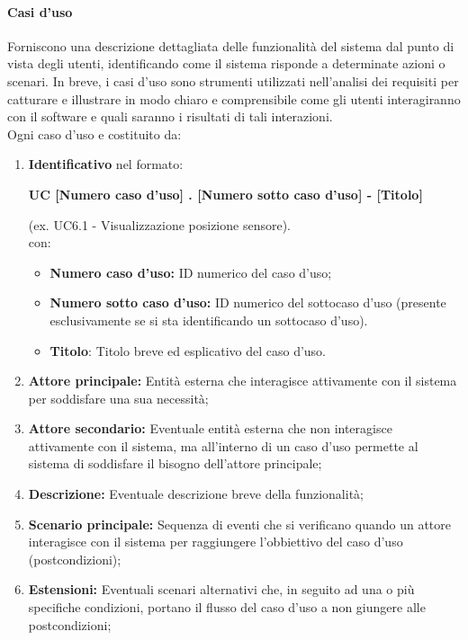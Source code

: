 \paragraph{Casi d'uso}
Forniscono una descrizione dettagliata delle funzionalità del sistema dal punto di vista degli utenti, identificando come il sistema risponde a determinate azioni o scenari. In breve, i casi d'uso sono strumenti utilizzati nell'analisi dei requisiti per catturare e illustrare in modo chiaro e comprensibile come gli utenti interagiranno con il software e quali saranno i risultati di tali interazioni. \\
Ogni caso d'uso e costituito da:
\begin{enumerate}
    \item \textbf{Identificativo} nel formato:\\
          \begin{center}
              \textbf{UC [Numero caso d'uso] . [Numero sotto caso d'uso] - [Titolo]}
          \end{center}
          (ex. UC6.1 - Visualizzazione posizione sensore).\\
          con:
          \begin{itemize}
              \item \textbf{Numero caso d'uso:} ID numerico del caso d'uso;
              \item \textbf{Numero sotto caso d'uso:} ID numerico del sottocaso d'uso (presente esclusivamente se si sta identificando un sottocaso d'uso).
              \item \textbf{Titolo}: Titolo breve ed esplicativo del caso d'uso.
          \end{itemize}
    \item \textbf{Attore principale:} Entità esterna che interagisce attivamente con il sistema per soddisfare una sua necessità;
    \item \textbf{Attore secondario:} Eventuale entità esterna che non interagisce attivamente con il sistema, ma all'interno di un caso d'uso permette al sistema di soddisfare il bisogno dell'attore principale;
    \item \textbf{Descrizione:} Eventuale descrizione breve della funzionalità;
    \item \textbf{Scenario principale:} Sequenza di eventi che si verificano quando un attore interagisce con il sistema per raggiungere l'obbiettivo del caso d'uso (postcondizioni);
    \item \textbf{Estensioni:} Eventuali scenari alternativi che, in seguito ad una o più specifiche condizioni, portano il flusso del caso d'uso a non giungere alle postcondizioni;

\end{enumerate}
